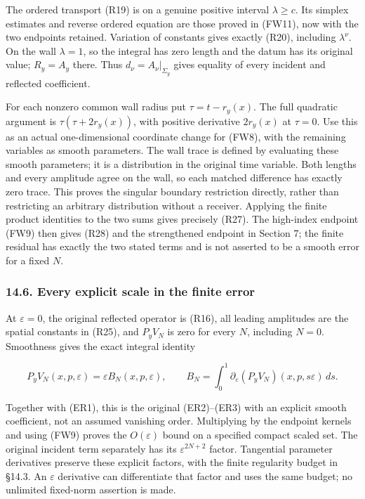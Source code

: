 \documentclass[
  11pt,
]{article}
\begin{document}
The ordered transport (R19) is on a genuine positive interval
\(\lambda\geq c\). Its simplex estimates and reverse ordered equation
are those proved in (FW11), now with the two endpoints retained.
Variation of constants gives exactly (R20), including \(\lambda^\nu\).
On the wall \(\lambda=1\), so the integral has zero length and the datum
has its original value; \(R_y=A_y\) there. Thus
\(d_\nu=A_\nu|_{\Sigma_y}\) gives equality of every incident and
reflected coefficient.

For each nonzero common wall radius put \(\tau=t-r_y(x)\). The full
quadratic argument is \(\tau(\tau+2r_y(x))\), with positive derivative
\(2r_y(x)\) at \(\tau=0\). Use this as an actual one-dimensional
coordinate change for (FW8), with the remaining variables as smooth
parameters. The wall trace is defined by evaluating these smooth
parameters; it is a distribution in the original time variable. Both
lengths and every amplitude agree on the wall, so each matched
difference has exactly zero trace. This proves the singular boundary
restriction directly, rather than restricting an arbitrary distribution
without a receiver. Applying the finite product identities to the two
sums gives precisely (R27). The high-index endpoint (FW9) then gives
(R28) and the strengthened endpoint in Section 7; the finite residual
has exactly the two stated terms and is not asserted to be a smooth
error for a fixed \(N\).

\subsubsection{14.6. Every explicit scale in the finite
error}\label{every-explicit-scale-in-the-finite-error}

At \(\varepsilon=0\), the original reflected operator is (R16), all
leading amplitudes are the spatial constants in (R25), and \(P_yV_N\) is
zero for every \(N\), including \(N=0\). Smoothness gives the exact
integral identity

\[
 P_yV_N(x,p,\varepsilon)=\varepsilon B_N(x,p,\varepsilon),\qquad
 B_N=\int_0^1\partial_\varepsilon(P_yV_N)(x,p,s\varepsilon)\,ds .
 \tag{FW14}
\]

Together with (ER1), this is the original (ER2)--(ER3) with an explicit
smooth coefficient, not an assumed vanishing order. Multiplying by the
endpoint kernels and using (FW9) proves the \(O(\varepsilon)\) bound on
a specified compact scaled set. The original incident term separately
has its \(\varepsilon^{2N+2}\) factor. Tangential parameter derivatives
preserve these explicit factors, with the finite regularity budget in
§14.3. An \(\varepsilon\) derivative can differentiate that factor and
uses the same budget; no unlimited fixed-norm assertion is made.
\end{document}
